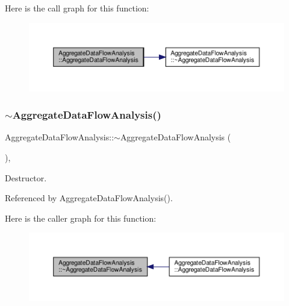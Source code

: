 Here is the call graph for this function\+:
\nopagebreak
\begin{figure}[H]
\begin{center}
\leavevmode
\includegraphics[width=350pt]{da/d29/classAggregateDataFlowAnalysis_a11a94cf943d80f0fefafbf8b91e72b20_cgraph}
\end{center}
\end{figure}
\mbox{\label{classAggregateDataFlowAnalysis_a4453b6eb3f34f327462b40fe1d83e0d9}} 
\subsubsection{\texorpdfstring{$\sim$\+Aggregate\+Data\+Flow\+Analysis()}{~AggregateDataFlowAnalysis()}}
{\footnotesize\ttfamily Aggregate\+Data\+Flow\+Analysis\+::$\sim$\+Aggregate\+Data\+Flow\+Analysis (\begin{DoxyParamCaption}{ }\end{DoxyParamCaption})\hspace{0.3cm}{\ttfamily [override]}, {\ttfamily [default]}}



Destructor. 



Referenced by Aggregate\+Data\+Flow\+Analysis().

Here is the caller graph for this function\+:
\nopagebreak
\begin{figure}[H]
\begin{center}
\leavevmode
\includegraphics[width=350pt]{da/d29/classAggregateDataFlowAnalysis_a4453b6eb3f34f327462b40fe1d83e0d9_icgraph}
\end{center}
\end{figure}


